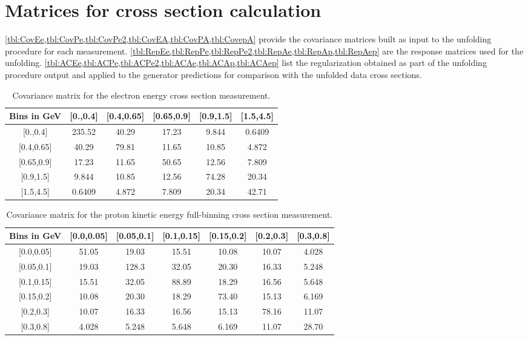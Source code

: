 \documentclass[amsmath,amssymb,aps,prd,showpacs,twocolumn,superscriptaddress,letterpaper,longbibliography, floatfix]{revtex4-2}
\begin{document}
\FloatBarrier
\section{Matrices for cross section calculation}
\label{app:matrix}
\cref{tbl:CovEe,tbl:CovPe,tbl:CovPe2,tbl:CovEA,tbl:CovPA,tbl:CovepA} provide the covariance matrices built as input to the unfolding procedure for each measurement. \cref{tbl:RepEe,tbl:RepPe,tbl:RepPe2,tbl:RepAe,tbl:RepAp,tbl:RepAep} are the response matrices used for the unfolding. \cref{tbl:ACEe,tbl:ACPe,tbl:ACPe2,tbl:ACAe,tbl:ACAp,tbl:ACAep} list the regularization obtained as part of the unfolding procedure output and applied to the generator predictions for comparison with the unfolded data cross sections.
\FloatBarrier
\begin{table}[H]
\caption{Covariance matrix for the electron energy cross section measurement.}
\label{tbl:CovEe}
\begin{center} \begin{tabular}{|c|c|c|c|c|c|}
\hline
Bins in GeV & [0.,0.4] & [0.4,0.65]& [0.65,0.9]& [0.9,1.5]& [1.5,4.5]\\\hline
{[0.,0.4]} &235.52 &40.29& 17.23 &9.844& 0.6409 	\\
{[0.4,0.65]}  &40.29& 79.81& 11.65& 10.85& 4.872  \\
{[0.65,0.9]}  &17.23& 11.65& 50.65& 12.56& 7.809   \\
{[0.9,1.5]}  &9.844& 10.85& 12.56& 74.28& 20.34   \\
{[1.5,4.5]}  & 0.6409& 4.872& 7.809& 20.34& 42.71 \\
\hline
\end{tabular} \end{center}
\end{table}
\FloatBarrier
\begin{table}[H]
\caption{Covariance matrix for the proton kinetic energy full-binning cross section measurement.} \label{tbl:CovPe}
\begin{center} \begin{tabular}{|c|c|c|c|c|c|c|}
\hline
Bins in GeV & [0.0,0.05] & [0.05,0.1]& [0.1,0.15]& [0.15,0.2]& [0.2,0.3]& [0.3,0.8]\\\hline
{[0.0,0.05]}  &51.05& 19.03& 15.51& 10.08& 10.07& 4.028 \\
{[0.05,0.1]}  &19.03& 128.3& 32.05& 20.30& 16.33& 5.248  \\
{[0.1,0.15]}  &15.51& 32.05& 88.89& 18.29& 16.56& 5.648  \\
{[0.15,0.2]}  &10.08& 20.30& 18.29& 73.40& 15.13& 6.169 \\
{[0.2,0.3]}  &10.07& 16.33& 16.56& 15.13& 78.16& 11.07  \\
{[0.3,0.8]}  &4.028& 5.248& 5.648& 6.169& 11.07& 28.70 \\
\hline
\end{tabular} \end{center}
\end{table}
\end{document}

